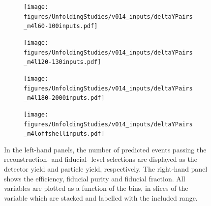 \FloatBarrier
\clearpage

\begin{figure}[htb]
    \centering 
    \begin{subfigure}{.99\textwidth}\centering
        \texttt{[image: figures/UnfoldingStudies/v014\_inputs/deltaYPairs\_m4l60-100inputs.pdf]}
    \end{subfigure}
    \begin{subfigure}{.99\textwidth}\centering
        \texttt{[image: figures/UnfoldingStudies/v014\_inputs/deltaYPairs\_m4l120-130inputs.pdf]}
    \end{subfigure}
    \begin{subfigure}{.99\textwidth}\centering
        \texttt{[image: figures/UnfoldingStudies/v014\_inputs/deltaYPairs\_m4l180-2000inputs.pdf]}
    \end{subfigure}
    \begin{subfigure}{.99\textwidth}\centering
        \texttt{[image: figures/UnfoldingStudies/v014\_inputs/deltaYPairs\_m4loffshellinputs.pdf]}
    \end{subfigure}
    \caption{In the left-hand panels, the number of predicted events passing the reconstruction- and fiducial- level selections are displayed as the detector yield and particle yield, respectively. The right-hand panel shows the efficiency, fiducial purity and fiducial fraction. All variables are plotted as a function of the \dYPairs bins, in slices of the \mFourL variable which are stacked and labelled with the included \mFourL range.
    \label{fig:dypunf}}
\end{figure}  

\FloatBarrier
\clearpage

